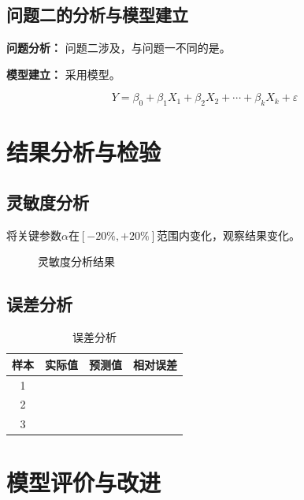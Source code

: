 \documentclass[12pt,a4paper]{article}
\begin{document}
\newpage

\subsection{问题二的分析与模型建立}

\textbf{问题分析：}
问题二涉及\underline{\hspace{4cm}}，与问题一不同的是\underline{\hspace{4cm}}。

\textbf{模型建立：}
采用\underline{\hspace{3cm}}模型。

\begin{equation}
  \label{eq:model2}
  Y = \beta_0 + \beta_1 X_1 + \beta_2 X_2 + \cdots + \beta_k X_k + \varepsilon
\end{equation}

\section{结果分析与检验}

\subsection{灵敏度分析}

将关键参数$\alpha$在$[-20\%, +20\%]$范围内变化，观察结果变化。

\begin{figure}[H]
\centering
\caption{灵敏度分析结果}
\label{fig:sensitivity}
\end{figure}

\subsection{误差分析}

\begin{table}[H]
\centering
\caption{误差分析}
\label{tab:error}
\begin{tabular}{cccc}
  \toprule
  样本 & 实际值 & 预测值 & 相对误差 \\
  \midrule
  1 &  &  & \\
  2 &  &  & \\
  3 &  &  & \\
  \bottomrule
\end{tabular}
\end{table}

\section{模型评价与改进}
\end{document}
